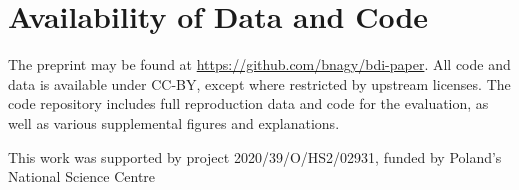 \documentclass[
    hf
]{ceurart}
\begin{document}
\section{Availability of Data and Code}\label{sec:data}

The preprint may be found at \url{https://github.com/bnagy/bdi-paper}. All code and data is
available under CC-BY, except where restricted by upstream licenses. The code repository includes
full reproduction data and code for the evaluation, as well as various supplemental figures and
explanations.

\FloatBarrier

\begin{acknowledgments}
    This work was supported by project 2020/39/O/HS2/02931, funded by Poland's National Science Centre
\end{acknowledgments}

%
\printbibliography
\appendix
\onecolumn
\end{document}
